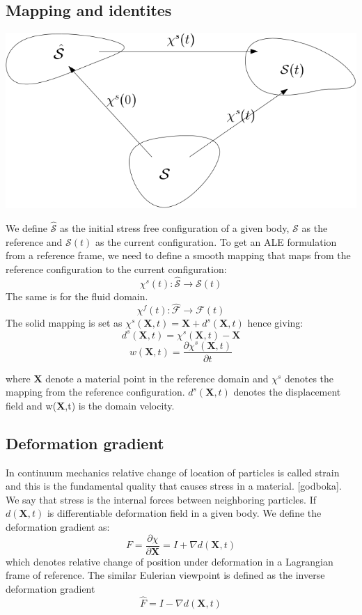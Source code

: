 \subsection*{Mapping and identites}
\includegraphics[scale=0.4]{continuum_mapping.png}

We define $ \hat{\mathcal{S}}$ as the initial stress free configuration of a given body, $\mathcal{S}$ as the reference and $\mathcal{S}(t)$ as the current configuration.
To get an ALE formulation from a reference frame, we need to define a smooth mapping that maps from the reference configuration to the current configuration:
$$  \chi^s(t) : \hat{\mathcal{S}} \rightarrow \mathcal{S}(t)     $$ 
The same is for the fluid domain.
$$  \chi^f(t) : \hat{\mathcal{F}} \rightarrow \mathcal{F}(t)     $$ 
The solid mapping is set as $\chi^s(\textbf{X},t) = \textbf{X}  + d^s(\textbf{X} ,t)$
hence giving:
$$  d^s(\textbf{X},t) = \chi^s(\textbf{X},t) -\textbf{X}   $$
$$  w(\textbf{X},t) = \frac{\partial \chi^s(\textbf{X},t)}{\partial t}   $$

where $\textbf{X}$ denote a material point in the reference domain and $\chi^s$ denotes the mapping from the reference configuration. 
$d^s(\textbf{X},t)$ denotes the displacement field and w(\textbf{X},t) is the domain velocity.

\subsection*{Deformation gradient}
In continuum mechanics relative change of location of particles is called strain and this is the fundamental quality that causes stress in a material. [godboka]. We say that stress is the internal forces between neighboring particles. 
If $d(\textbf{X},t)$ is differentiable deformation field in a given body. We define the deformation gradient as:  
$$F = \frac{\partial \chi}{\partial \textbf{X}} = I + \nabla d(\textbf{X},t)$$ 
which denotes relative change of position under deformation in a Lagrangian frame of reference. The similar Eulerian viewpoint is defined as the inverse deformation gradient 
$$ \hat{F} = I - \nabla  d(\textbf{X},t)$$



